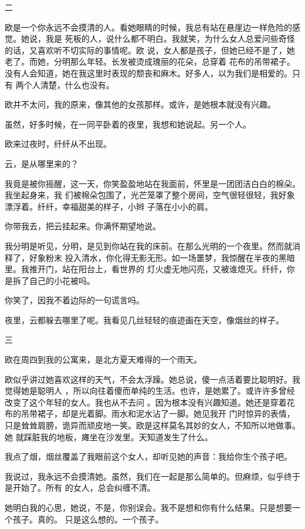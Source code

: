 \documentclass[12pt,a4paper]{article}
\newcommand{\subpart}[1]{
	\begingroup \par
	\vspace{1ex} \centering #1
	\par \endgroup
}
\begin{document}
		\subpart{二}

		欧是一个你永远不会摸清的人。看她眼睛的时候，我总有站在悬崖边一样危险的感觉。她说，我是
	死板的人，说什么都不明白。我就笑，为什么女人总爱问些奇怪的话，又喜欢听不切实际的事情呢。欧
	说，女人都是孩子，但她已经不是了，她老了。而她，分明那么年轻。长发被烫成瑰丽的花朵，总穿着
	花布的吊带裙子。没有人会知道，她在我这里时表现的颓丧和麻木。好多人，以为我们是相爱的。只有
	两个人清楚，什么也没有。

		欧并不太问，我的原来，像其他的女孩那样。或许，是她根本就没有兴趣。\par
		虽然，好多时候，在一同平卧着的夜里，我想和她说起。另一个人。\par
		欧来过夜时，纤纤从不出现。\par
		云，是从哪里来的？

		我竟是被你摇醒，这一天，你笑盈盈地站在我面前，怀里是一团团洁白白的棉朵。我坐起身来，我
	们被棉朵包围了，光芒笼罩了整个房间，空气很轻很轻，我好象漂浮着。纤纤，幸福甜美的样子，小辫
	子落在小小的肩。

		你带我去，把云挂起来。你满怀期望地说。

		我分明是听见，分明，是见到你站在我的床前。在那么光明的一个夜里。然而就消释了，好象粉末
	投入清水，你化得无影无形。如一场噩梦，我惊醒在半夜的黑暗里。我推开门，站在阳台上，看世界的
	灯火虚无地闪亮，又被谁熄灭。纤纤，你是拆了自己的小花被吗。

		你笑了，因我不着边际的一句谎言吗。\par
		夜里，云都躲去哪里了呢。我看见几丝轻轻的痕迹画在天空，像烟丝的样子。

		\subpart{三}

		欧在周四到我的公寓来，是北方夏天难得的一个雨天。

		欧似乎讲过她喜欢这样的天气，不会太浮躁。她总说，傻一点活着要比聪明好。我觉得她是聪明人
	，所以向往着傻而单纯的生活。也许，是她累了。或许许多曾经改变了这个年轻的女人。我也从不去问
	。因为根本没有兴趣知道。她还是穿着花布的吊带裙子，却是光着脚。雨水和泥水沾了一脚。她见我开
	门时惊异的表情，只是耸耸肩膀，诡异而顽皮地一笑。欧是这样莫名其妙的女人，不知所以地做事。她
	就踩脏我的地板，瘫坐在沙发里。天知道发生了什么。

		我点了烟，烟丝覆盖了我眼前这个女人，却听见她的声音：我给你生个孩子吧。

		我说过，我永远不会摸清她。虽然，我们在一起是那么简单的。但麻烦，似乎终于是开始了。所有
	的女人，总会纠缠不清。

		她明白我的心思，她说，不是，你别误会。我不是想和你有什么结果。只是想要一个孩子。真的。
	只是这么想的。一个孩子。
\end{document}
